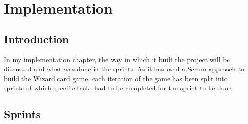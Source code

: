 \chapter{Implementation}

\section{Introduction}
In my implementation chapter, the way in which it built the project will be discussed and what was done in the sprints. As it has used a Scrum approach to build the Wizard card game, each iteration of the game has been split into sprints of which specific tasks had to be completed for the sprint to be done.
\section{Sprints}
